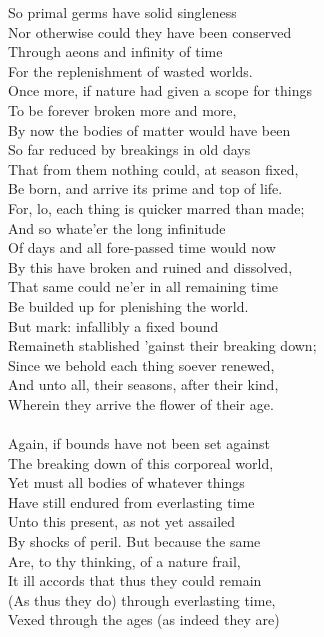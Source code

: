 So primal germs have solid singleness\\
Nor otherwise could they have been conserved\\
Through aeons and infinity of time\\
For the replenishment of wasted worlds.\\
Once more, if nature had given a scope for things\\
To be forever broken more and more,\\
By now the bodies of matter would have been\\
So far reduced by breakings in old days\\
That from them nothing could, at season fixed,\\
Be born, and arrive its prime and top of life.\\
For, lo, each thing is quicker marred than made;\\
And so whate'er the long infinitude\\
Of days and all fore-passed time would now\\
By this have broken and ruined and dissolved,\\
That same could ne'er in all remaining time\\
Be builded up for plenishing the world.\\
But mark: infallibly a fixed bound\\
Remaineth stablished 'gainst their breaking down;\\
Since we behold each thing soever renewed,\\
And unto all, their seasons, after their kind,\\
Wherein they arrive the flower of their age.\\
\\
Again, if bounds have not been set against\\
The breaking down of this corporeal world,\\
Yet must all bodies of whatever things\\
Have still endured from everlasting time\\
Unto this present, as not yet assailed\\
By shocks of peril. But because the same\\
Are, to thy thinking, of a nature frail,\\
It ill accords that thus they could remain\\
(As thus they do) through everlasting time,\\
Vexed through the ages (as indeed they are)\\

